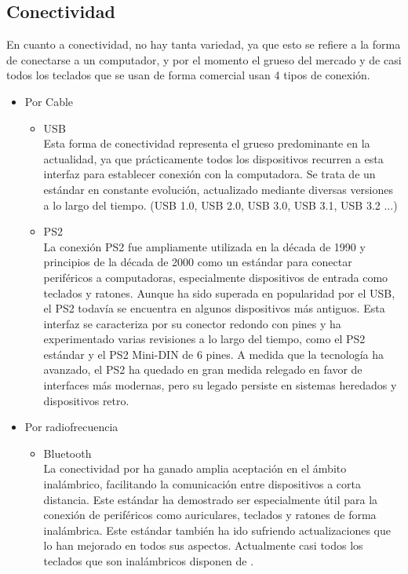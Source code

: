 \subsection{Conectividad}
En cuanto a conectividad, no hay tanta variedad, ya que esto se refiere a la forma de conectarse a un computador, y por el momento el grueso del mercado y de casi todos los teclados que se usan de forma comercial usan 4 tipos de conexión. 
\newpage
\begin{itemize}
    \item Por Cable \cite{Keyboards-connection-types-wired}
    \begin{itemize}
        \item \gls{USB} \\
            Esta forma de conectividad representa el grueso predominante en la actualidad, ya que prácticamente todos los dispositivos recurren a esta interfaz para establecer conexión con la computadora. Se trata de un estándar en constante evolución, actualizado mediante diversas versiones a lo largo del tiempo.  (\gls{USB} 1.0, \gls{USB} 2.0, \gls{USB} 3.0, \gls{USB} 3.1, \gls{USB} 3.2 ...)
        \item \gls{PS2} \\
            La conexión \gls{PS2} fue ampliamente utilizada en la década de 1990 y principios de la década de 2000 como un estándar para conectar periféricos a computadoras, especialmente dispositivos de entrada como teclados y ratones. Aunque ha sido superada en popularidad por el \gls{USB}, el \gls{PS2} todavía se encuentra en algunos dispositivos más antiguos. Esta interfaz se caracteriza por su conector redondo con pines y ha experimentado varias revisiones a lo largo del tiempo, como el \gls{PS2} estándar y el \gls{PS2} Mini-DIN de 6 pines. A medida que la tecnología ha avanzado, el \gls{PS2} ha quedado en gran medida relegado en favor de interfaces más modernas, pero su legado persiste en sistemas heredados y dispositivos retro. 
    \end{itemize}
    \item Por radiofrecuencia \cite{Keyboards-connection-types-wireless}
    \begin{itemize}
        \item \gls{Bluetooth} \\
            La conectividad por  ha ganado amplia aceptación en el ámbito inalámbrico, facilitando la comunicación entre dispositivos a corta distancia. Este estándar ha demostrado ser especialmente útil para la conexión de periféricos como auriculares, teclados y ratones de forma inalámbrica. Este estándar también ha ido sufriendo actualizaciones que lo han mejorado en todos sus aspectos. Actualmente casi todos los teclados que son inalámbricos disponen de .
    

\end{itemize}
\end{itemize}
